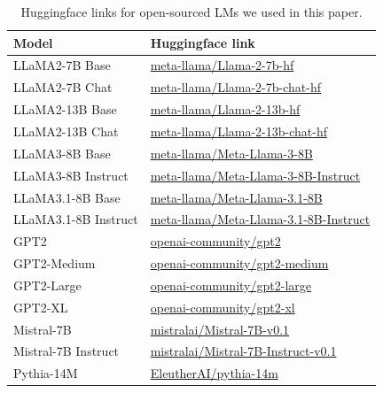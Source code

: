 \begin{table}[htbp]
\vspace{-.2cm}
\caption{Huggingface links for open-sourced LMs we used in this paper.}
\vspace{-.3cm}
\begin{center}
\begin{tabular}{l|l}
\toprule
Model & Huggingface link \\
\midrule
LLaMA2-7B Base & \href{https://huggingface.co/meta-llama/Llama-2-7b-hf}{meta-llama/Llama-2-7b-hf} \\
LLaMA2-7B Chat & \href{https://huggingface.co/meta-llama/Llama-2-7b-chat-hf}{{meta-llama/Llama-2-7b-chat-hf}} \\
LLaMA2-13B Base & \href{https://huggingface.co/meta-llama/Llama-2-13b-hf}{meta-llama/Llama-2-13b-hf} \\
LLaMA2-13B Chat & \href{https://huggingface.co/meta-llama/Llama-2-13b-chat-hf}{meta-llama/Llama-2-13b-chat-hf} \\
LLaMA3-8B Base & \href{https://huggingface.co/meta-llama/Meta-Llama-3-8B}{meta-llama/Meta-Llama-3-8B} \\
LLaMA3-8B Instruct & \href{https://huggingface.co/meta-llama/Meta-Llama-3-8B-Instruct}{meta-llama/Meta-Llama-3-8B-Instruct} \\
LLaMA3.1-8B Base & \href{https://huggingface.co/meta-llama/Meta-Llama-3.1-8B}{meta-llama/Meta-Llama-3.1-8B} \\
LLaMA3.1-8B Instruct & \href{https://huggingface.co/meta-llama/Meta-Llama-3.1-8B-Instruct}{meta-llama/Meta-Llama-3.1-8B-Instruct} \\
\midrule
GPT2 & \href{https://huggingface.co/openai-community/gpt2}{openai-community/gpt2}\\
GPT2-Medium &\href{https://huggingface.co/openai-community/gpt2-medium}{openai-community/gpt2-medium} \\
GPT2-Large & \href{https://huggingface.co/openai-community/gpt2-large}{openai-community/gpt2-large}\\
GPT2-XL & \href{https://huggingface.co/openai-community/gpt2-xl}{openai-community/gpt2-xl}\\
\midrule
Mistral-7B & \href{https://huggingface.co/mistralai/Mistral-7B-v0.1}{mistralai/Mistral-7B-v0.1}\\
Mistral-7B Instruct & \href{https://huggingface.co/mistralai/Mistral-7B-Instruct-v0.1}{mistralai/Mistral-7B-Instruct-v0.1} \\
\midrule
Pythia-14M & \href{https://huggingface.co/EleutherAI/pythia-14m}{EleutherAI/pythia-14m} \\

\end{tabular}
\end{center}
\end{table}
